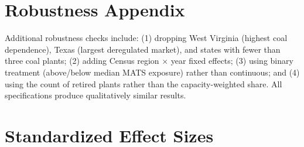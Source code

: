 \documentclass[12pt]{article}
\begin{document}
\section{Robustness Appendix}

Additional robustness checks include: (1) dropping West Virginia (highest coal dependence), Texas (largest deregulated market), and states with fewer than three coal plants; (2) adding Census region $\times$ year fixed effects; (3) using binary treatment (above/below median MATS exposure) rather than continuous; and (4) using the count of retired plants rather than the capacity-weighted share. All specifications produce qualitatively similar results.

\section{Standardized Effect Sizes}
\label{sec:sde}


\end{document}
